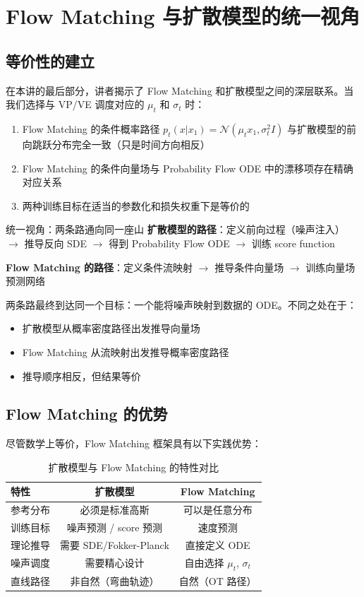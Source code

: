 \section{Flow Matching 与扩散模型的统一视角}

\subsection{等价性的建立}

在本讲的最后部分，讲者揭示了 Flow Matching 和扩散模型之间的深层联系。当我们选择与 VP/VE 调度对应的 $\mu_t$ 和 $\sigma_t$ 时：

\begin{enumerate}
    \item Flow Matching 的条件概率路径 $p_t(x | x_1) = \mathcal{N}(\mu_t x_1, \sigma_t^2 I)$ 与扩散模型的前向跳跃分布完全一致（只是时间方向相反）
    \item Flow Matching 的条件向量场与 Probability Flow ODE 中的漂移项存在精确对应关系
    \item 两种训练目标在适当的参数化和损失权重下是等价的
\end{enumerate}

\begin{importantbox}{统一视角：两条路通向同一座山}
\textbf{扩散模型的路径}：定义前向过程（噪声注入） $\to$ 推导反向 SDE $\to$ 得到 Probability Flow ODE $\to$ 训练 score function

\textbf{Flow Matching 的路径}：定义条件流映射 $\to$ 推导条件向量场 $\to$ 训练向量场预测网络

两条路最终到达同一个目标：一个能将噪声映射到数据的 ODE。不同之处在于：
\begin{itemize}
    \item 扩散模型从概率密度路径出发推导向量场
    \item Flow Matching 从流映射出发推导概率密度路径
    \item 推导顺序相反，但结果等价
\end{itemize}
\end{importantbox}

\subsection{Flow Matching 的优势}

尽管数学上等价，Flow Matching 框架具有以下实践优势：

\begin{table}[H]
\centering
\begin{tabular}{lcc}
\toprule
\textbf{特性} & \textbf{扩散模型} & \textbf{Flow Matching} \\
\midrule
参考分布 & 必须是标准高斯 & 可以是任意分布 \\
训练目标 & 噪声预测 / score 预测 & 速度预测 \\
理论推导 & 需要 SDE/Fokker-Planck & 直接定义 ODE \\
噪声调度 & 需要精心设计 & 自由选择 $\mu_t$, $\sigma_t$ \\
直线路径 & 非自然（弯曲轨迹） & 自然（OT 路径） \\
\bottomrule
\end{tabular}
\caption{扩散模型与 Flow Matching 的特性对比}
\end{table}

